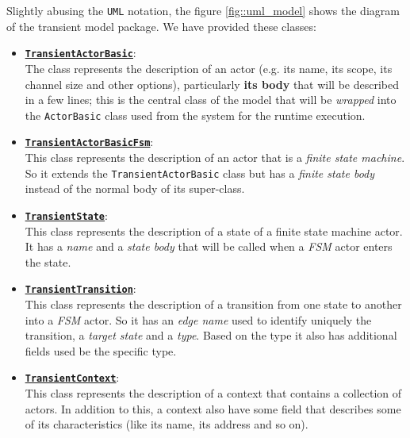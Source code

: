 Slightly abusing the \texttt{UML} notation, the figure \ref{fig::uml_model} shows the diagram of the transient model package. We have provided these classes:
\begin{itemize}
	\item \href{https://github.com/LM-96/QA-Extensions/blob/main/it.unibo.qakactor/src/main/kotlin/model/TransientActorBasic.kt}{\underline{\textbf{\texttt{TransientActorBasic}}}}:\\
	The class represents the description of an actor (e.g. its name, its scope, its channel size and other options), particularly \textbf{its body} that will be described in a few lines; this is the central class of the model that will be \textit{wrapped} into the \texttt{ActorBasic} class used from the system for the runtime execution.
	
	\item \href{https://github.com/LM-96/QA-Extensions/blob/main/it.unibo.qakactor/src/main/kotlin/model/TransientActorBasicFsm.kt}{\underline{\textbf{\texttt{TransientActorBasicFsm}}}}:\\
	This class represents the description of an actor that is a \textit{finite state machine}. So it extends the \texttt{TransientActorBasic} class but has a \textit{finite state body} instead of the normal body of its super-class.
	
	\item
	\href{https://github.com/LM-96/QA-Extensions/blob/main/it.unibo.qakactor/src/main/kotlin/model/TransientState.kt}{\underline{\textbf{\texttt{TransientState}}}}:\\
	This class represents the description of a state of a finite state machine actor. It has a 	\textit{name} and a \textit{state body} that will be called when a \textit{FSM} actor enters the state.
	
	\item
	\href{https://github.com/LM-96/QA-Extensions/blob/main/it.unibo.qakactor/src/main/kotlin/model/TransitentTransition.kt}{\underline{\textbf{\texttt{TransientTransition}}}}:\\
	This class represents the description of a transition from one state to another into a \textit{FSM} actor. So it has an \textit{edge name} used to identify uniquely the transition, a \textit{target state} and a \textit{type}. Based on the type it also has additional fields used be the specific type.
	
	\item 
	\href{https://github.com/LM-96/QA-Extensions/blob/main/it.unibo.qakactor/src/main/kotlin/model/TransientContext.kt}{\underline{\textbf{\texttt{TransientContext}}}}:\\
	This class represents the description of a context that contains a collection of actors. In addition to this, a context also have some field that describes some of its characteristics (like its name, its address and so on).
	

\end{itemize}
